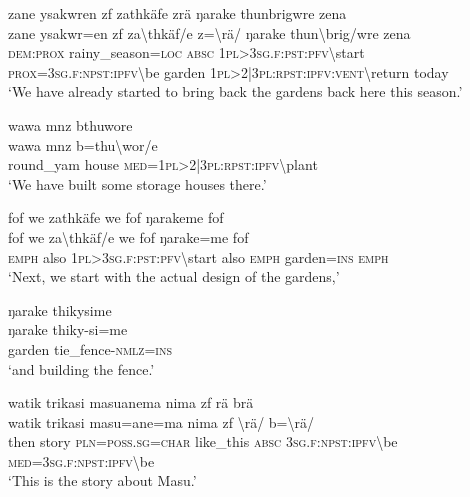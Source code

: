 \newpage
\ea\label{ex:2:a1688}
zane ysakwren zf zathkäfe zrä ŋarake thunbrigwre zena\\
\gll zane	ysakwr=en	zf	za{\textbackslash}thkäf/e	z={\textbackslash}rä/	ŋarake	thun{\textbackslash}brig/wre	zena\\
     \textsc{dem}:\textsc{prox}	rainy\_season=\textsc{loc}	\textsc{absc}	1\textsc{pl}>3\textsc{sg}.\textsc{f}:\textsc{pst}:\textsc{pfv}{\textbackslash}start	\textsc{prox}=3\textsc{sg}.\textsc{f}:\textsc{npst}:\textsc{ipfv}{\textbackslash}be	garden	1\textsc{pl}>2|3\textsc{pl}:\textsc{rpst}:\textsc{ipfv}:\textsc{vent}{\textbackslash}return	today\\
\glt `We have already started to bring back the gardens back here this season.'
\z

\ea\label{ex:2:a1689}
wawa mnz bthuwore\\
\gll wawa	mnz	b=thu{\textbackslash}wor/e\\
     round\_yam	house	\textsc{med}=1\textsc{pl}>2|3\textsc{pl}:\textsc{rpst}:\textsc{ipfv}{\textbackslash}plant\\
\glt `We have built some storage houses there.'
\z

\ea\label{ex:2:a1690}
fof we zathkäfe we fof ŋarakeme fof\\
\gll fof	we	za{\textbackslash}thkäf/e	we	fof	ŋarake=me	fof\\
     \textsc{emph}	also	1\textsc{pl}>3\textsc{sg}.\textsc{f}:\textsc{pst}:\textsc{pfv}{\textbackslash}start	also	\textsc{emph}	garden=\textsc{ins}	\textsc{emph}\\
\glt `Next, we start with the actual design of the gardens,'
\z

\ea\label{ex:2:a1692}
ŋarake thikysime\\
\gll ŋarake	thiky-si=me\\
     garden	tie\_fence-\textsc{nmlz}=\textsc{ins}\\
\glt `and building the fence.'
\z

\ea\label{ex:2:a1693}
watik trikasi masuanema nima zf rä brä\\
\gll watik	trikasi	masu=ane=ma	nima	zf	{\textbackslash}rä/	b={\textbackslash}rä/\\
     then	story	\textsc{pln}=\textsc{poss}.\textsc{sg}=\textsc{char}	like\_this	\textsc{absc}	3\textsc{sg}.\textsc{f}:\textsc{npst}:\textsc{ipfv}{\textbackslash}be	\textsc{med}=3\textsc{sg}.\textsc{f}:\textsc{npst}:\textsc{ipfv}{\textbackslash}be\\
\glt `This is the story about Masu.'
\z

